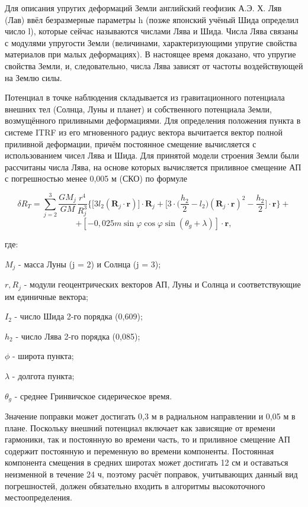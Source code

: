 \documentclass[14pt,a4paper,oneside]{extarticle}
\begin{document}
Для описания упругих деформаций Земли английский геофизик А.Э. Х. Ляв (Лав) ввёл безразмерные параметры h (позже японский учёный Шида определил число l), которые сейчас называются числами Лява и Шида. Числа Лява связаны с модулями упругости Земли (величинами, характеризующими упругие свойства материалов при малых деформациях). В настоящее время доказано, что упругие свойства Земли, и, следовательно, числа Лява зависят от частоты воздействующей на Землю силы.

Потенциал в точке наблюдения складывается из гравитационного потенциала внешних тел (Солнца, Луны и планет) и собственного потенциала Земли, возмущённого приливными деформациями. Для определения положения пункта в системе ITRF из его мгновенного радиус вектора вычитается вектор полной приливной деформации, причём постоянное смещение вычисляется с использованием чисел Лява и Шида.
Для принятой модели строения Земли были рассчитаны числа Лява, на основе которых вычисляется приливное смещение АП с погрешностью менее 0,005 м (СКО) по формуле

\[\delta R_T = \sum_{j=2}^{3}\frac{GM_{j}}{GM}\frac{r^{4}}{R_{j}^{3}}\Big\{\Big[3l_{2}(\boldsymbol{R}_{j}\cdot\boldsymbol{r})\Big]\cdot\boldsymbol{R}_{j}+\Big[3\cdot\Big(\frac{h_{2}}{2}-l_{2}\Big)(\boldsymbol{R}_{j}\cdot\boldsymbol{r})^{2}-\frac{h_{2}}{2}\Big]\cdot\boldsymbol{r}\Big\}+\]
\[+\left[-0{,}025m\sin\varphi\cos\varphi\sin(\theta_g+\lambda)\right]\cdot\boldsymbol{r},\]

где:

$M_j$ - масса Луны (j = 2) и Солнца (j = 3);

$r, R_j$ - модули геоцентрических векторов АП, Луны и Солнца и соответствующие им единичные вектора;

$I_2$ - число Шида 2-го порядка (0,609); 

$h_2$ - число Лява 2-го порядка (0,085); 

$\phi$ - широта пункта;

$\lambda$ - долгота пункта;

$\theta_g$ - среднее Гринвичское сидерическое время.

Значение поправки может достигать 0,3 м в радиальном направлении и 0,05 м в плане. Поскольку внешний потенциал включает как зависящие от времени гармоники, так и постоянную во времени часть, то и приливное смещение АП содержит постоянную и переменную во времени компоненты. Постоянная компонента смещения в средних широтах может достигать 12 см и оставаться неизменной в течение 24 ч, поэтому расчёт поправок, учитывающих данный вид погрешностей, должен обязательно входить в алгоритмы высокоточного местоопределения.
\end{document}
